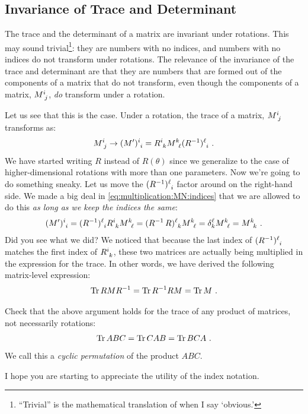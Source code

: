 \documentclass[12pt, oneside]{report}    %
\let\oldsection\section
\def\section{%
  \setcounter{sidenote}{1}%
  \oldsection
}
\begin{document}
\begin{subappendices}
\section{Invariance of Trace and Determinant}

The trace and the determinant of a matrix are invariant under rotations. This may sound trivial\footnote{``Trivial'' is the mathematical translation of when I say `obvious.'}: they are numbers with no indices, and numbers with no indices do not transform under rotations. The relevance of the invariance of the trace and determinant are that they are numbers that are formed out of the components of a matrix that do not transform, even though the components of a matrix, $M\aij{i}{j}$, \emph{do} transform under a rotation. 

Let us see that this is the case. Under a rotation, the trace of a matrix, $M\aij{i}{j}$ transforms as:
\begin{align}
    M\aij{i}{j} \to (M')\aij{i}{i} = R\aij{i}{k} M\aij{k}{\ell} (R\inv)\aij{\ell}{i} \ .
\end{align}
We have started writing $R$ instead of $R(\theta)$ since we generalize to the case of higher-dimensional rotations with more than one parameters. Now we're going to do something sneaky. Let us move the $(R\inv)\aij{\ell}{i}$ factor around on the right-hand side. We made a big deal in \eqref{eq:multiplication:MN:indices} that we are allowed to do this \emph{as long as we keep the indices the same}:
\begin{align}
    (M')\aij{i}{i}
    =
    (R\inv)\aij{\ell}{i} R\aij{i}{k} M\aij{k}{\ell} 
    = (R\inv\, R)\aij{\ell}{k} M\aij{k}{\ell} 
    = \delta^\ell_k M\aij{k}{\ell} 
    = M\aij{k}{k} \ . 
\end{align}
Did you see what we did? We noticed that because the last index of $(R\inv)\aij{\ell}{i}$ matches the first index of $R\aij{i}{k}$, these two matrices are actually being multiplied in the expression for the trace. In other words, we have derived the following matrix-level expression:
\begin{align}
    \operatorname{\textnormal{Tr}} R M R^{-1} = \operatorname{\textnormal{Tr}} R^{-1} R M = \operatorname{\textnormal{Tr}} M \ .
\end{align}
\begin{exercise}
Check that the above argument holds for the trace of any product of matrices, not necessarily rotations:
\begin{align}
    \operatorname{\textnormal{Tr}} ABC = \operatorname{\textnormal{Tr}} CAB = \operatorname{\textnormal{Tr}} BCA \ .
\end{align}
We call this a \emph{cyclic permutation} of the product $ABC$.
\end{exercise}
I hope you are starting to appreciate the utility of the index notation.


\end{subappendices}
\end{document}
